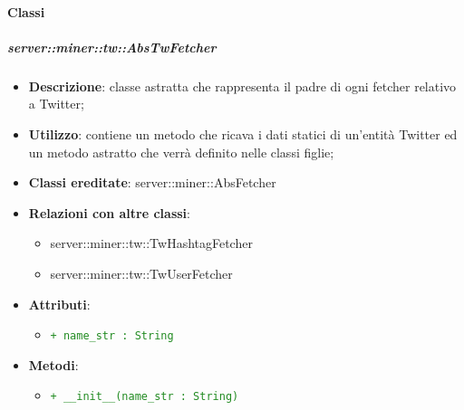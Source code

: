 	\paragraph{Classi} %
	\subparagraph{server::miner::tw::AbsTwFetcher} %
		\label{subp:server_miner_tw_AbsTwFetcher}
			\begin{itemize}
				\item \textbf{Descrizione}: classe astratta che rappresenta il padre di ogni fetcher relativo a Twitter;
				\item \textbf{Utilizzo}: contiene un metodo che ricava i dati statici di un'entità Twitter ed un metodo astratto che verrà definito nelle classi figlie;
				\item \textbf{Classi ereditate}: server::miner::AbsFetcher
				\item \textbf{Relazioni con altre classi}:
					\begin{itemize}
						\item server::miner::tw::TwHashtagFetcher
						\item server::miner::tw::TwUserFetcher
					\end{itemize}
				\item \textbf{Attributi}:   
					\begin{itemize}
						\item \textcolor{forestgreen}{\texttt{+ name\_str : String}}
					\end{itemize}
				\item \textbf{Metodi}:  
					\begin{itemize}
						\item \textcolor{forestgreen}{\texttt{+ \_\_init\_\_(name\_str : String)}}
					\end{itemize}
			\end{itemize}

